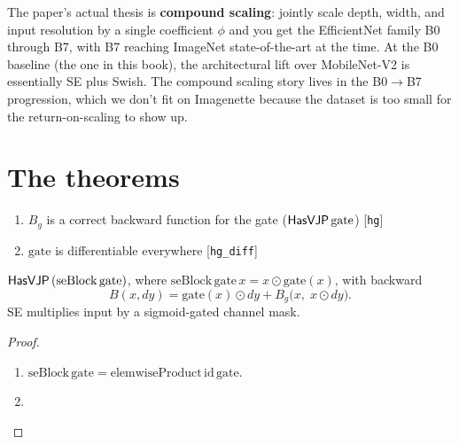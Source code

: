 The paper's actual thesis is \textbf{compound scaling}:
jointly scale depth, width, and input resolution by a single
coefficient \(\phi\) and you get the EfficientNet family
B0 through B7, with B7 reaching ImageNet state-of-the-art at the
time. At the B0 baseline (the one in this book), the architectural
lift over MobileNet-V2 is essentially SE plus Swish. The compound
scaling story lives in the B0$\to$B7 progression, which we don't
fit on Imagenette because the dataset is too small for the
return-on-scaling to show up.

\section{The theorems}



\begin{theorem}
  \label{thm:seBlockHasVJP}
  \leanok
  \Assume{}
  \begin{enumerate}
    \item \(B_g\) is a correct backward function for the gate
          (\(\mathsf{HasVJP}\, \mathrm{gate}\)) \hfill[\texttt{hg}]
    \item \(\mathrm{gate}\) is differentiable everywhere
          \hfill[\texttt{hg\_diff}]
  \end{enumerate}
  \Prove{} \(\mathsf{HasVJP}\, (\mathrm{seBlock}\, \mathrm{gate})\), where
  \(\mathrm{seBlock}\, \mathrm{gate}\, x = x \odot \mathrm{gate}(x)\),
  with backward
  \[
    B(x, dy) = \mathrm{gate}(x) \odot dy
      + B_g\bigl(x,\; x \odot dy\bigr).
  \]
  SE multiplies input by a sigmoid-gated channel mask.
\end{theorem}

\begin{proof}
\leanok
\begin{enumerate}
  \item \(\mathrm{seBlock}\, \mathrm{gate} =
    \mathrm{elemwiseProduct}\, \mathrm{id}\, \mathrm{gate}\).
  \item \Qed{}
\end{enumerate}
\end{proof}

